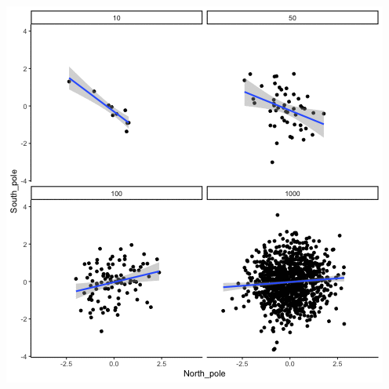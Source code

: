 \documentclass[
]{book}
\begin{document}
\includegraphics{gifs/corNormFourNsTypeI-1.gif}
\end{document}
